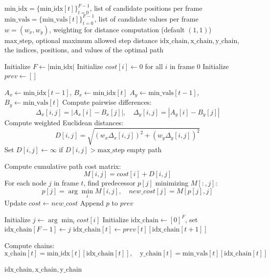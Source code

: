 \begin{algorithm}[H]
\caption{Dynamic Programming for Best 2D Chain of Points}
\label{alg:best_chain_2d}
\begin{algorithmic}[1]
\Require 
    $\text{min\_idx} = \{ \text{min\_idx}[t] \}_{t=0}^{F-1}$, list of candidate positions per frame\\
    $\text{min\_vals} = \{ \text{min\_vals}[t] \}_{t=0}^{F-1}$, list of candidate values per frame\\
    $w = (w_x, w_y)$, weighting for distance computation (default $(1,1)$)\\
    $\text{max\_step}$, optional maximum allowed step distance
\Ensure
    $\text{idx\_chain}, \text{x\_chain}, \text{y\_chain}$, the indices, positions, and values of the optimal path

\State Initialize $F \gets |\text{min\_idx}|$
\State Initialize $cost[i] \gets 0$ for all $i$ in frame $0$
\State Initialize $prev \gets []$ 

    \State $A_x \gets \text{min\_idx}[t-1]$, $B_x \gets \text{min\_idx}[t]$
    \State $A_y \gets \text{min\_vals}[t-1]$, $B_y \gets \text{min\_vals}[t]$
    \State Compute pairwise differences:
        \[
        \Delta_x[i,j] = |A_x[i] - B_x[j]|, \quad 
        \Delta_y[i,j] = |A_y[i] - B_y[j]|
        \]
    \State Compute weighted Euclidean distances:
        \[
        D[i,j] = \sqrt{ (w_x \Delta_x[i,j])^2 + (w_y \Delta_y[i,j])^2 }
        \]
        \State Set $D[i,j] \gets \infty$ if $D[i,j] > \text{max\_step}$
            \State \Return empty path
        \EndIf
    \EndIf

    \State Compute cumulative path cost matrix:
        \[
        M[i,j] = cost[i] + D[i,j]
        \]
    \State For each node $j$ in frame $t$, find predecessor $p[j]$ minimizing $M[:,j]$:
        \[
        p[j] = \arg\min_i M[i,j], \quad
        new\_cost[j] = M[p[j], j]
        \]
    \State Update $cost \gets new\_cost$
    \State Append $p$ to $prev$
\EndFor

\State Initialize $j \gets \arg\min_i cost[i]$  
\State Initialize $\text{idx\_chain} \gets [0]^{F}$, set $\text{idx\_chain}[F-1] \gets j$
    \State $\text{idx\_chain}[t] \gets prev[t][\text{idx\_chain}[t+1]]$
\EndFor

\State Compute chains:
\[
\text{x\_chain}[t] = \text{min\_idx}[t][\text{idx\_chain}[t]], \quad
\text{y\_chain}[t] = \text{min\_vals}[t][\text{idx\_chain}[t]]
\]

\State \Return $\text{idx\_chain}, \text{x\_chain}, \text{y\_chain}$
\end{algorithmic}
\end{algorithm}